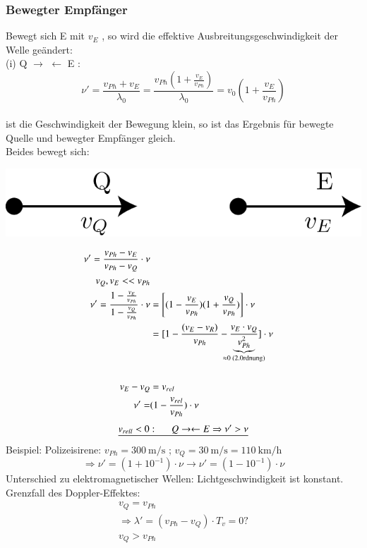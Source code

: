 \subsubsection{Bewegter Empfänger}
Bewegt sich E mit $ v_E $ , so wird die effektive Ausbreitungsgeschwindigkeit der Welle geändert:\\

(i) Q $ \rightarrow $ $ \leftarrow $ E :\\
$$ \nu'  = \frac{v_{Ph}+v_E}{\lambda_0} = \frac{v_{Ph}(1+\frac{v_E}{v_{Ph}})}{\lambda_0}=v_0(1+\frac{v_E}{v_{Ph}})$$\\
ist die Geschwindigkeit der Bewegung klein, so ist das Ergebnis für bewegte Quelle und bewegter Empfänger gleich.\\
Beides bewegt sich: 
\begin{center}
	\includegraphics[width=0.3\linewidth]{skizzen/19/19B30}
\end{center}
\begin{align*}
\nu'=\frac{v_{Ph}-v_E}{v_{Ph}-v_Q} \cdot \nu \\
v_Q,v_E << v_{Ph}\\
\nu'=\frac{1-\frac{v_E}{v_{Ph}}}{1-\frac{v_Q}{v_{Ph}}} \cdot \nu &= \left[ (1-\frac{v_E}{v_{Ph}}) (1+\frac{v_Q}{v_{Ph}})  \right] \cdot \nu \\
&= [ 1-\frac{(v_E-v_R)}{v_{Ph}} - \frac{v_E \cdot v_Q}{\underbrace{v^2_{Ph}}_{\mathclap{\approx 0 \text{ (2.0rdnung)}}}}  ] \cdot \nu\\
\enter
v_E-v_Q&=v_{rel}\\
\nu'=&(1-\frac{v_{rel}}{v_{Ph}}) \cdot \nu
\end{align*}
$$ \underline{v_{rell} < 0: \hspace{5mm} Q\rightarrow\leftarrow E \Rightarrow \nu' > \nu} $$
Beispiel: Polizeisirene: $ v_{Ph} = \SI{300}{\meter\per\second} $ ; $ v_Q=\SI{30}{\meter\per\second} = \SI{110}{\kilo\meter\per\hour}$
$$ \Rightarrow \nu'=(1+10^{-1}) \cdot \nu \longrightarrow \nu' = (1-10^{-1}) \cdot \nu $$
\HL
Unterschied zu elektromagnetischer Wellen: Lichtgeschwindigkeit ist konstant.\\
Grenzfall des Doppler-Effektes:
\begin{align*}
v_Q=v_{Ph}\\
\Rightarrow \lambda'=(v_{Ph} - v_Q) \cdot T_v = 0?\\
v_Q > v_{Ph}
\end{align*}
